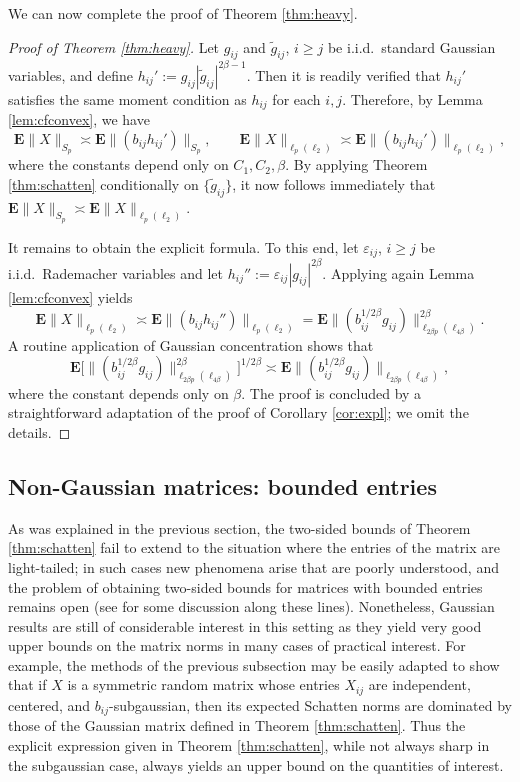 \documentclass[10pt,reqno]{amsart}
\theoremstyle{definition}
\numberwithin{equation}{section}
\numberwithin{figure}{section}
\numberwithin{table}{section}
\begin{document}
We can now complete the proof of Theorem \ref{thm:heavy}.

\begin{proof}[Proof of Theorem \ref{thm:heavy}]
Let $g_{ij}$ and $\tilde g_{ij}$, $i\ge j$ be i.i.d.\ standard Gaussian 
variables, and define $h_{ij}' := g_{ij}|\tilde g_{ij}|^{2\beta-1}$.
Then it is readily verified that $h_{ij}'$ satisfies the same moment 
condition as $h_{ij}$ for each $i,j$. Therefore, by Lemma 
\ref{lem:cfconvex}, we have
$$
	\mathbf{E}\|X\|_{S_p}\asymp
	\mathbf{E}\|(b_{ij}h_{ij}')\|_{S_p},
	\qquad
	\mathbf{E}\|X\|_{\ell_p(\ell_2)}\asymp
	\mathbf{E}\|(b_{ij}h_{ij}')\|_{\ell_p(\ell_2)},	
$$
where the constants depend only on $C_1,C_2,\beta$. By applying Theorem 
\ref{thm:schatten} conditionally on $\{\tilde g_{ij}\}$, it now follows 
immediately that $\mathbf{E}\|X\|_{S_p}\asymp\mathbf{E}\|X\|_{\ell_p(\ell_2)}$.

It remains to obtain the explicit formula. To this end, let 
$\varepsilon_{ij}$, $i\ge j$ be i.i.d.\ Rademacher variables and let
$h_{ij}'' := \varepsilon_{ij}|g_{ij}|^{2\beta}$. Applying again Lemma
\ref{lem:cfconvex} yields
$$
	\mathbf{E}\|X\|_{\ell_p(\ell_2)} \asymp
	\mathbf{E}\|(b_{ij}h_{ij}'')\|_{\ell_p(\ell_2)} =
	\mathbf{E}\|(b_{ij}^{1/2\beta}g_{ij})\|_{\ell_{2\beta p}(\ell_{4\beta})}^{2\beta}.
$$
A routine application of Gaussian concentration
\cite[Theorem 5.8]{BLM13} shows that
$$
	\mathbf{E}\big[
	\|(b_{ij}^{1/2\beta}g_{ij})\|_{\ell_{2\beta p}(\ell_{4\beta})}^{2\beta}
	\big]^{1/2\beta}
	\asymp
	\mathbf{E}\|(b_{ij}^{1/2\beta}g_{ij})\|_{\ell_{2\beta 
	p}(\ell_{4\beta})},
$$
where the constant depends only on $\beta$.
The proof is concluded by a straightforward adaptation of the proof of
Corollary \ref{cor:expl}; we omit the details.
\end{proof}


\subsection{Non-Gaussian matrices: bounded entries}
\label{sec:bdd}

As was explained in the previous section, the two-sided bounds of Theorem 
\ref{thm:schatten} fail to extend to the situation where the entries of 
the matrix are light-tailed; in such cases new phenomena arise that are 
poorly understood, and the problem of obtaining two-sided bounds for 
matrices with bounded entries remains open (see \cite[section 4.2]{BvH16} 
for some discussion along these lines). Nonetheless, Gaussian results are 
still of considerable interest in this setting as they yield very good 
upper bounds on the matrix norms in many cases of practical interest. For 
example, the methods of the previous subsection may be easily adapted to 
show that if $X$ is a symmetric random matrix whose entries $X_{ij}$ are 
independent, centered, and $b_{ij}$-subgaussian, then its expected 
Schatten norms are dominated by those of the Gaussian matrix defined in 
Theorem \ref{thm:schatten}. Thus the explicit expression given in Theorem 
\ref{thm:schatten}, while not always sharp in the subgaussian case, always 
yields an upper bound on the quantities of interest.
\end{document}
